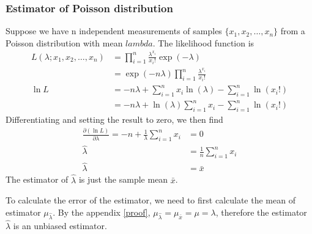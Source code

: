 \documentclass[12pt,a4paper]{report}
\begin{document}
\subsubsection{Estimator of Poisson distribution}
Suppose we have n independent measurements of samples $\{ x_1, x_2, \dots , x_n \}$ from a Poisson distribution with mean $lambda$. The likelihood function is
\begin{align}
L(\lambda;x_1,x_2,\dots,x_n) &= \prod_{i = 1}^{n} \frac{\lambda^{x_i}}{x_i !} \exp(-\lambda) \\
&= \exp(-n \lambda) \prod_{i = 1}^{n} \frac{\lambda^{x_i}}{x_i !} \\
\ln L &= -n \lambda + \sum_{i = 1}^{n} x_i \ln(\lambda) - \sum_{i = 1}^{n} \ln(x_i !) \\
&= -n \lambda + \ln(\lambda) \sum_{i = 1}^{n} x_i - \sum_{i = 1}^{n} \ln(x_i !)
\end{align}
Differentiating and setting the result to zero, we then find
\begin{align}
\frac{\partial ( \ln L )}{\partial \lambda} = -n + \frac{1}{\lambda} \sum_{i = 1}^{n} x_i &= 0 \\
\hat{\lambda} &= \frac{1}{n} \sum_{i = 1}^{n} x_i \\
\hat{\lambda} &= \bar{x}
\end{align}
The estimator of $\hat{\lambda}$ is just the sample mean $\bar{x}$.

To calculate the error of the estimator, we need to first calculate the mean of estimator $\mu_{\hat{\lambda}}$.
By the appendix \ref{proof}, $\mu_{\hat{\lambda}} = \mu_{\bar{x}} = \mu = \lambda$, therefore the estimator $\hat{\lambda}$ is an unbiased estimator.
\end{document}
